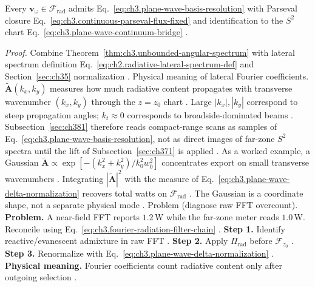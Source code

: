 \begin{theorem}
\label{thm:ch3.plane-wave-Fourier-equivalence}
Every \(\mathbf{v}_\omega\in\mathcal{F}_{\mathrm{rad}}\) admits Eq.~\eqref{eq:ch3.plane-wave-basis-resolution} with
Parseval closure Eq.~\eqref{eq:ch3.continuous-parseval-flux-fixed} and identification to the \(S^{2}\) chart
Eq.~\eqref{eq:ch3.plane-wave-continuum-bridge} \cite{stratton1941}.
\end{theorem}
\noindent\textit{Proof.}
Combine Theorem~\ref{thm:ch3.unbounded-angular-spectrum} with lateral spectrum definition
Eq.~\eqref{eq:ch2.radiative-lateral-spectrum-def} and Section~\ref{sec:ch35} normalization \cite{stratton1941}.
Physical meaning of lateral Fourier coefficients. \(\widetilde{\mathbf{A}}(k_{x},k_{y})\) measures how much radiative content propagates with transverse wavenumber
\((k_{x},k_{y})\) through the \(z=z_{0}\) chart \cite{stratton1941}. Large \(|k_{x}|,|k_{y}|\) correspond to
steep propagation angles; \(k_{t}\approx0\) corresponds to broadside-dominated beams \cite{harrington2001}.
Subsection~\ref{sec:ch381} therefore reads compact-range scans as samples of Eq.~\eqref{eq:ch3.plane-wave-basis-resolution},
not as direct images of far-zone \(S^{2}\) spectra until the lift of Subsection~\ref{sec:ch371} is applied
\cite{hansen1988}.
As a worked example, a Gaussian \(\widetilde{\mathbf{A}}\propto\exp[-(k_{x}^{2}+k_{y}^{2})/k_{0}^{2}w_{0}^{2}]\) concentrates export on
small transverse wavenumbers \cite{jackson1999}. Integrating \(| \widetilde{\mathbf{A}}|^{2}\) with the
measure of Eq.~\eqref{eq:ch3.plane-wave-delta-normalization} recovers total watts on \(\mathcal{F}_{\mathrm{rad}}\)
\cite{poynting1884}. The Gaussian is a coordinate shape, not a separate physical mode \cite{harrington2001}.
Problem (diagnose raw FFT overcount). \textbf{Problem.} A near-field FFT reports \(1.2\,\mathrm{W}\) while the far-zone meter reads \(1.0\,\mathrm{W}\). Reconcile using
Eq.~\eqref{eq:ch3.fourier-radiation-filter-chain} \cite{harrington2001}.
\textbf{Step 1.} Identify reactive/evanescent admixture in raw FFT \cite{stratton1941}.
\textbf{Step 2.} Apply \(\Pi_{\mathrm{rad}}\) before \(\mathcal{F}_{z_{0}}\) \cite{harrington2001}.
\textbf{Step 3.} Renormalize with Eq.~\eqref{eq:ch3.plane-wave-delta-normalization} \cite{hansen1988}.
\textbf{Physical meaning.} Fourier coefficients count radiative content only after outgoing selection \cite{harrington2001}.
